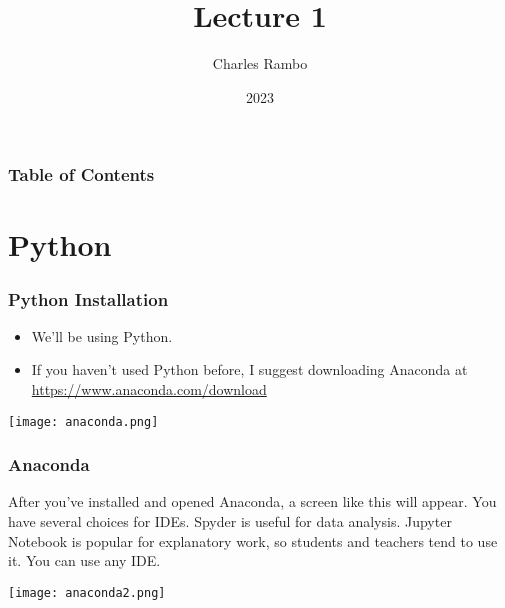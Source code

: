 \documentclass{beamer}
\title{Lecture 1}
\author{Charles Rambo}
\institute{UCLA Anderson School of Management}
\date{2023}
\begin{document}
\insertTitleSlide


\begin{frame}
\frametitle{Table of Contents}
\tableofcontents
\end{frame}

\section{Python}

\begin{frame}
\frametitle{Python Installation}
\begin{itemize}
\item We'll be using Python.
\item If you haven't used Python before, I suggest downloading Anaconda at  \url{https://www.anaconda.com/download}
\end{itemize}
\begin{center}
\texttt{[image: anaconda.png]}
\end{center}
\end{frame}

\begin{frame}
\frametitle{Anaconda}

After you've installed and opened Anaconda, a screen like this will appear. You have several choices for IDEs. Spyder is useful for data analysis. Jupyter Notebook is popular for explanatory work, so students and teachers tend to use it. You can use any IDE.
\begin{center}
\texttt{[image: anaconda2.png]}
\end{center}
\end{frame}


\end{document}
